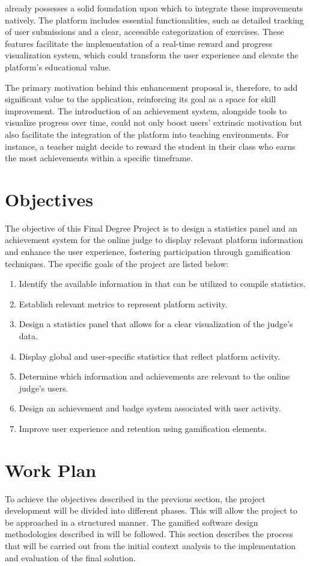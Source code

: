 \aer already possesses a solid foundation upon which to integrate these improvements natively. The platform includes essential functionalities, such as detailed tracking of user submissions and a clear, accessible categorization of exercises. These features facilitate the implementation of a real-time reward and progress visualization system, which could transform the user experience and elevate the platform's educational value.

The primary motivation behind this enhancement proposal is, therefore, to add significant value to the application, reinforcing its goal as a space for skill improvement. The introduction of an achievement system, alongside tools to visualize progress over time, could not only boost users' extrinsic motivation but also facilitate the integration of the platform into teaching environments. For instance, a teacher might decide to reward the student in their class who earns the most achievements within a specific timeframe.

\section{Objectives}
The objective of this Final Degree Project is to design a statistics panel and an achievement system for the online judge \aer to display relevant platform information and enhance the user experience, fostering participation through gamification techniques. The specific goals of the project are listed below:
\begin{enumerate}
    \item Identify the available information in \aer that can be utilized to compile statistics.
    \item Establish relevant metrics to represent platform activity.
    \item Design a statistics panel that allows for a clear visualization of the judge's data.
    \item Display global and user-specific statistics that reflect platform activity.
    \item Determine which information and achievements are relevant to the online judge's users.
    \item Design an achievement and badge system associated with user activity.
    \item Improve user experience and retention using gamification elements.
\end{enumerate}


\section{Work Plan}
To achieve the objectives described in the previous section, the project development will be divided into different phases. This will allow the project to be approached in a structured manner. The gamified software design methodologies described in \cite{Morschheuser_Hassan_Werder_Hamari_2018} will be followed. This section describes the process that will be carried out from the initial context analysis to the implementation and evaluation of the final solution.

